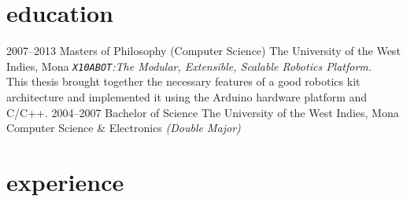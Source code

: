 \documentclass[]{friggeri-cv} %
\begin{document}

\section{education}

\begin{entrylist}
\entry
{2007--2013}
{Masters {\normalfont of Philosophy (Computer Science)}}
{The University of the West Indies, Mona}
{\emph{\texttt{X10ABOT}:The Modular, Extensible, Scalable Robotics Platform.} \\ This thesis brought together the necessary features of a good robotics kit architecture and implemented it using the Arduino hardware platform and C/C++.}
\entry
{2004--2007}
{Bachelor {\normalfont of Science}}
{The University of the West Indies, Mona}
{Computer Science \& Electronics \emph{(Double Major)}}
\end{entrylist}


\section{experience}
\end{document}
